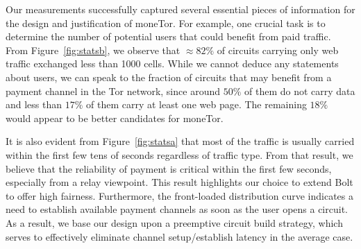 Our measurements successfully captured several essential pieces of information for the design and justification of moneTor.
For example, one crucial task is to determine the number of potential users that could benefit from paid traffic.
From Figure~\ref{fig:statsb}, we observe that $\approx 82\%$ of circuits carrying only web traffic exchanged less than 1000 cells.
While we cannot deduce any statements about users, we can speak to the fraction of circuits that may benefit from a payment channel in the Tor network, since around $50\%$ of them do not carry data and less than $17\%$ of them carry at least one web page.
The remaining $18\%$ would appear to be better candidates for moneTor.

It is also evident from Figure~\ref{fig:statsa} that most of the traffic is usually carried within the first few tens of seconds regardless of traffic type.
From that result, we believe that the reliability of payment is critical within the first few seconds, especially from a relay viewpoint.
This result highlights our choice to extend Bolt to offer high fairness.
Furthermore, the front-loaded distribution curve indicates a need to establish available payment channels as soon as the user opens a circuit.
As a result, we base our design upon a preemptive circuit build strategy, which serves to effectively eliminate channel setup/establish latency in the average case.
